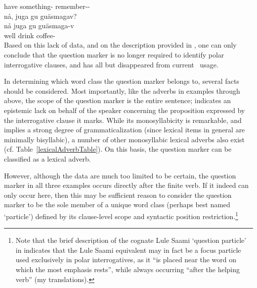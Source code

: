 	have\BS{}   something- remember--\\\nopagebreak
{}  %
\z
\ea\label{Qpart3}
\glll	nå, juga gu guäsmagav?\\
	nå juga gu guäsmaga-v\\
	well drink\BS{}  coffee-\\\nopagebreak
{} %
\z
Based on this lack of data, and on the description provided in \citet{Lagercrantz1926}, 
one can only conclude that the question marker is no longer required to identify polar interrogative clauses, and has all but disappeared from current \PS\ usage. %

In determining which word class the question marker belongs to, several facts should be considered. %
Most importantly, like the adverbs in examples  through  above, the scope of the question marker is the entire sentence; \TILDE{} indicates an epistemic lack on behalf of the speaker concerning the proposition expressed by the interrogative clause it marks. While its monosyllabicity is remarkable, and implies a strong degree of grammaticalization (since lexical items in general are minimally bisyllabic), a number of other monosyllabic lexical adverbs also exist (cf. Table~\vref{lexicalAdverbTable}). On this basis, the question marker can be classified as a lexical adverb. 

However, although the data are much too limited to be certain, the question marker in all three examples occurs directly after the finite verb. If it indeed can only occur here, then this may be sufficient reason to consider the question marker to be the sole member of a unique word class (perhaps best named ‘particle’) defined by its clause-level scope and syntactic position restriction.\footnote{Note that the brief description of the cognate Lule Saami ‘question particle’ in \mbox{\citet[95]{Spiik1989}} indicates that the Lule Saami equivalent may in fact be a focus particle used exclusively in polar interrogatives, as it “is placed near the word on which the most emphasis rests”, while always occurring “after the helping verb” (my translations).} %




